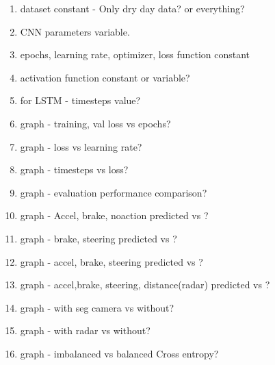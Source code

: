 \begin{enumerate}
    \item dataset constant - Only dry day data?
        or everything?
    \item CNN parameters variable.
    \item epochs, learning rate, optimizer, loss function constant
    \item activation function constant or variable?
    \item for LSTM - timesteps value?
    \item graph - training, val loss vs epochs?
    \item graph - loss vs learning rate?
    \item graph - timesteps vs loss?
    \item graph - evaluation performance comparison?
    \item graph - Accel, brake, noaction predicted vs ?
    \item graph - brake, steering predicted vs ?
    \item graph - accel, brake, steering predicted vs ?
    \item graph - accel,brake, steering, distance(radar) predicted vs ?
    \item graph - with seg camera vs without?
    \item graph - with radar vs without?
    \item graph - imbalanced vs balanced Cross entropy?

\end{enumerate}
\fi

